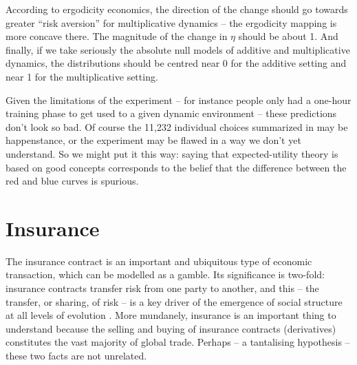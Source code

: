 According to ergodicity economics, the direction of the change should go towards 
greater ``risk aversion'' for multiplicative dynamics -- the ergodicity mapping is more 
concave there. The magnitude of the change in $\eta$ should be about 1. And finally, 
if we take seriously the absolute null models of additive and multiplicative dynamics, 
the distributions should be centred near 0 for the additive setting and near 1 for the 
multiplicative setting. 

Given the limitations of the experiment -- for instance people only had a one-hour 
training phase to get used to a given dynamic environment -- these predictions don't look 
so bad. Of course the 11,232 individual choices summarized in  
may be happenstance, or the experiment may be flawed in a way we don't yet 
understand. So we might put it this way: saying that expected-utility theory is 
based on good concepts corresponds to the belief that the difference between 
the red and blue curves is spurious.

\section{Insurance}
The insurance contract is an important and ubiquitous type of economic transaction, 
which can be modelled as a gamble. Its significance is two-fold: insurance contracts 
transfer risk from one party to another, and this -- the transfer, or sharing, of risk -- is 
a key driver of the emergence of social structure at all levels of evolution 
. More mundanely, insurance is an important thing
to understand because the selling and buying of insurance contracts (derivatives)
constitutes the vast majority of global trade. Perhaps -- a tantalising hypothesis -- 
these two facts are not unrelated.

